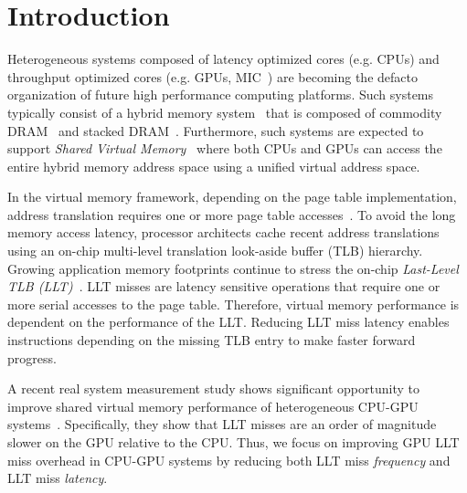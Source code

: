 
\section{Introduction}

\noindent Heterogeneous systems composed of latency optimized cores
(e.g. CPUs) and throughput optimized cores (e.g. GPUs, MIC~\cite{MIC})
are becoming the defacto organization of future high performance
computing platforms. Such systems typically consist of a hybrid memory
system~\cite{hbm_intel,hbm_amd,hbm_nvidia} that is composed of
commodity DRAM~\cite{ddr4-spec} and stacked
DRAM~\cite{hbm-spec,hmc_spec}. Furthermore, such systems are expected
to support {\em Shared Virtual Memory}~\cite{HSA,UVM} where both CPUs
and GPUs can access the entire hybrid memory address space using a
unified virtual address space. 

In the virtual memory framework, depending on the page table
implementation, address translation requires one or more page table
accesses~\cite{Bhargava2008}. To avoid the long memory access latency,
processor architects cache recent address translations using an
on-chip multi-level translation look-aside buffer (TLB) hierarchy.
Growing application memory footprints continue to stress the on-chip 
{\em Last-Level TLB (LLT)}~\cite{spectlb, Basu2013, SharedLLT, COLT}. 
LLT misses are latency sensitive operations that require one or more 
serial accesses to the page table. Therefore, virtual memory 
performance is dependent on the performance of the LLT. Reducing LLT
miss latency enables instructions depending on the missing TLB entry
to make faster forward progress.

A recent real system measurement study shows significant opportunity
to improve shared virtual memory performance of heterogeneous CPU-GPU
systems~\cite{vesley2016ispass}. Specifically, they show that LLT
misses are an order of magnitude slower on the GPU relative to the
CPU. Thus, we focus on improving GPU LLT miss overhead in CPU-GPU
systems by reducing both LLT miss {\em frequency} and LLT miss {\em
latency}.



